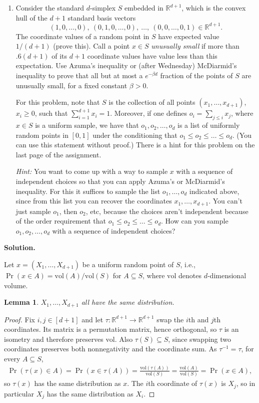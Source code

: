 \documentclass[11pt,letterpaper]{article}
\newtheorem{lemma}[theorem]{Lemma}
\theoremstyle{definition}
\newcommand{\reals}{\mathbb{R}}
\newcommand{\solution}{\medskip\noindent\textbf{Solution.}\par\medskip}
\begin{document}
\begin{enumerate}[resume]
\item Consider the standard $d$-simplex $S$ embedded in $\reals^{d+1}$, which is the convex hull of the $d+1$ standard basis vectors
\[
(1,0,\dots,0),\ (0,1,0,\dots,0),\ \dots,\ (0,0,\dots,0,1)\in\reals^{d+1}.
\]
The coordinate values of a random point in $S$ have expected value $1/(d+1)$ (prove this). Call a point $x\in S$ \emph{unusually small} if more than $.6(d+1)$ of its $d+1$ coordinate values have value less than this expectation. Use Azuma's inequality or (after Wednesday) McDiarmid's inequality to prove that all but at most a $e^{-\beta d}$ fraction of the points of $S$ are unusually small, for a fixed constant $\beta>0$.

For this problem, note that $S$ is the collection of all points $(x_1,\dots,x_{d+1})$, $x_i\geq 0$, such that $\sum_{i=1}^{d+1}x_i = 1$. Moreover, if one defines $o_i = \sum_{j\leq i}x_j$, where $x\in S$ is a uniform sample, we have that $o_1,o_2,\dots,o_d$ is a list of uniformly random points in $[0,1]$ under the conditioning that $o_1\leq o_2\leq\dots\leq o_d$. (You can use this statement without proof.) There is a hint for this problem on the last page of the assignment.

\emph{Hint:} You want to come up with a way to sample $x$ with a sequence of independent choices so that you can apply Azuma's or McDiarmid's inequality. For this it suffices to sample the list $o_1,\dots,o_d$ indicated above, since from this list you can recover the coordinates $x_1,\dots,x_{d+1}$. You can't just sample $o_1$, then $o_2$, etc, because the choices aren't independent because of the order requirement that $o_1\leq o_2\leq\dots\leq o_d$. How can you sample $o_1,o_2,\dots,o_d$ with a sequence of independent choices?
\end{enumerate}

\solution

Let $x = (X_1,\dots,X_{d+1})$ be a uniform random point of $S$, i.e., $\Pr(x\in A) = \mathrm{vol}(A)/\mathrm{vol}(S)$ for $A\subseteq S$, where $\mathrm{vol}$ denotes $d$-dimensional volume.

\begin{lemma}\label{lem:symmetry}
    $X_1,\dots,X_{d+1}$ all have the same distribution.
\end{lemma}
\begin{proof}
    Fix $i,j\in[d+1]$ and let $\tau:\reals^{d+1}\to\reals^{d+1}$ swap the $i$th and $j$th coordinates.
    Its matrix is a permutation matrix, hence orthogonal, so $\tau$ is an isometry and therefore preserves $\mathrm{vol}$.
    Also $\tau(S)\subseteq S$, since swapping two coordinates preserves both nonnegativity and the coordinate sum.
    As $\tau^{-1} = \tau$, for every $A\subseteq S$,
    \begin{align*}
        \Pr(\tau(x)\in A) = \Pr(x\in\tau(A)) = \frac{\mathrm{vol}(\tau(A))}{\mathrm{vol}(S)} = \frac{\mathrm{vol}(A)}{\mathrm{vol}(S)} = \Pr(x\in A),
    \end{align*}
    so $\tau(x)$ has the same distribution as $x$.
    The $i$th coordinate of $\tau(x)$ is $X_j$, so in particular $X_j$ has the same distribution as $X_i$.
\end{proof}
\end{document}
